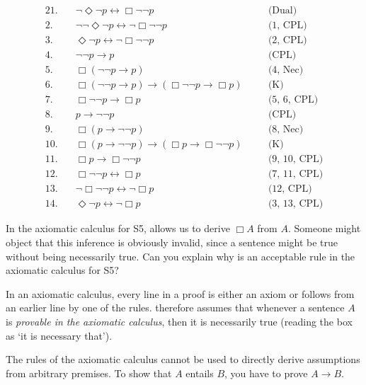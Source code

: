 \begin{solution}
\begin{sollist}
    \item 
    \begin{alignat*}{2}
      1.\quad& \neg \Diamond \neg p \leftrightarrow \Box \neg\neg p &\quad& \text{(Dual)}\\
      2.\quad& \neg\neg \Diamond \neg p \leftrightarrow \neg \Box \neg\neg p &\quad& \text{(1, CPL)}\\
      3.\quad& \Diamond \neg p \leftrightarrow \neg \Box \neg\neg p &\quad& \text{(2, CPL)}\\
      4.\quad& \neg\neg p \to p &\quad& \text{(CPL)}\\
      5.\quad& \Box(\neg\neg p \to p) &\quad& \text{(4, Nec)}\\
      6.\quad& \Box(\neg\neg p \to p) \to (\Box \neg\neg p \to \Box p)&\quad& \text{(K)}\\
      7.\quad& \Box \neg\neg p \to \Box p&\quad& \text{(5, 6, CPL)}\\
      8.\quad& p \to \neg\neg p &\quad& \text{(CPL)}\\
      9.\quad& \Box(p \to \neg\neg p) &\quad& \text{(8, Nec)}\\
      10.\quad& \Box(p \to \neg\neg p) \to (\Box p \to \Box \neg\neg p)&\quad& \text{(K)}\\
      11.\quad& \Box p \to \Box \neg\neg p &\quad& \text{(9, 10, CPL)}\\
      12.\quad& \Box \neg\neg p \leftrightarrow \Box p &\quad& \text{(7, 11, CPL)}\\
      13.\quad& \neg \Box \neg\neg p \leftrightarrow \neg \Box p &\quad& \text{(12, CPL)}\\
      14.\quad& \Diamond \neg p \leftrightarrow \neg \Box p &\quad& \text{(3, 13, CPL)}
    \end{alignat*}
    
  \end{sollist}
\end{solution}

\begin{exercise}
  In the axiomatic calculus for S5,  allows us to derive $\Box A$
  from $A$. Someone might object that this inference is obviously invalid, since
  a sentence might be true without being necessarily true. Can you explain why
   is an acceptable rule in the axiomatic calculus for S5?
\end{exercise}
\begin{solution}
  In an axiomatic calculus, every line in a proof is either an axiom or follows
  from an earlier line by one of the rules.  therefore assumes that
  whenever a sentence $A$ is \emph{provable in the axiomatic calculus}, then it
  is necessarily true (reading the box as `it is necessary that'). 

  The rules of the axiomatic calculus cannot be used to directly derive
  assumptions from arbitrary premises. To show that $A$ entails $B$, you have to
  prove $A \to B$.
\end{solution}

